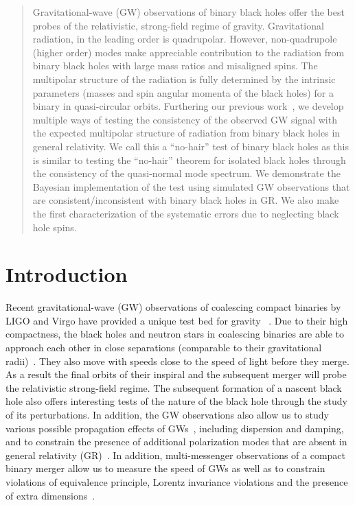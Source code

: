 \documentclass[prd,preprintnumbers,twocolumn,eqsecnum,floatfix,a4paper,nofootinbib,superscriptaddress]{revtex4}
\begin{document}
\begin{abstract}
Gravitational-wave (GW) observations of binary black holes offer the best probes of the relativistic, strong-field regime of gravity. Gravitational radiation, in the leading order is quadrupolar. However, non-quadrupole (higher order) modes make appreciable contribution to the radiation from binary black holes with large mass ratios and misaligned spins. The multipolar structure of the radiation is fully determined by the intrinsic parameters (masses and spin angular momenta of the black holes) for a binary in quasi-circular orbits. Furthering our previous work~\cite{Dhanpal:2018ufk}, we develop multiple ways of testing the consistency of the observed GW signal with the expected multipolar structure of radiation from binary black holes in general relativity. We call this a ``no-hair'' test of binary black holes as this is similar to testing the ``no-hair'' theorem for isolated black holes through the consistency of the quasi-normal mode spectrum. We demonstrate the Bayesian implementation of the test using simulated GW observations that are consistent/inconsistent with binary black holes in GR. We also make the first characterization of the systematic errors due to neglecting black hole spins. 
\end{abstract}
\preprint{}
\maketitle
\section{Introduction}

Recent gravitational-wave (GW) observations of coalescing compact binaries by LIGO and Virgo have provided a unique test bed for gravity ~\cite{LSC_2016grtests,gw170104,ligo2019tests,abbott2019tests,abbott2017gravitational}. Due to their high compactness, the black holes and neutron stars in coalescing binaries are able to approach each other in close separations (comparable to their gravitational radii)~\cite{GW150914}. They also move with speeds close to the speed of light before they merge. As a result the final orbits of their inspiral and the subsequent merger will probe the relativistic strong-field regime. The subsequent formation of a nascent black hole also offers interesting tests of the nature of the black hole through the study of its perturbations. In addition, the GW observations also allow us to study various possible propagation effects of GWs~\cite{samajdar2017projected}, including dispersion and damping, and to constrain the presence of additional polarization modes that are absent in general relativity (GR)~\cite{isi2017probing}. In addition, multi-messenger observations of a compact binary merger allow us to measure the speed of GWs as well as to constrain violations of equivalence principle, Lorentz invariance violations and the presence of extra dimensions~\cite{abbott2019tests,abbott2017gravitational}. 
\end{document}
